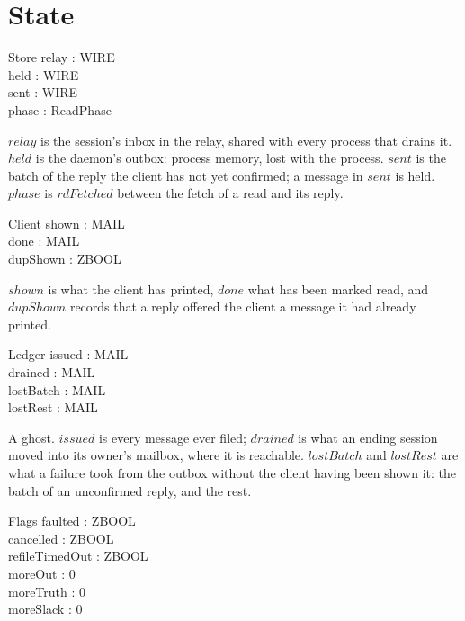 \documentclass[a4paper,10pt,fleqn]{article}
\begin{document}
\section{State}

\begin{schema}{Store}
  relay : \power WIRE \\
  held : \power WIRE \\
  sent : \power WIRE \\
  phase : ReadPhase
\end{schema}

$relay$ is the session's inbox in the relay, shared with every process that
drains it.  $held$ is the daemon's outbox: process memory, lost with the
process.  $sent$ is the batch of the reply the client has not yet confirmed;
a message in $sent$ is held.  $phase$ is $rdFetched$ between the fetch of a
read and its reply.

\begin{schema}{Client}
  shown : \power MAIL \\
  done : \power MAIL \\
  dupShown : ZBOOL
\end{schema}

$shown$ is what the client has printed, $done$ what has been marked read, and
$dupShown$ records that a reply offered the client a message it had already
printed.

\begin{schema}{Ledger}
  issued : \power MAIL \\
  drained : \power MAIL \\
  lostBatch : \power MAIL \\
  lostRest : \power MAIL
\end{schema}

A ghost.  $issued$ is every message ever filed; $drained$ is what an ending
session moved into its owner's mailbox, where it is reachable.  $lostBatch$
and $lostRest$ are what a failure took from the outbox without the client
having been shown it: the batch of an unconfirmed reply, and the rest.

\begin{schema}{Flags}
  faulted : ZBOOL \\
  cancelled : ZBOOL \\
  refileTimedOut : ZBOOL \\
  moreOut : 0  \\
  moreTruth : 0  \\
  moreSlack : 0 
\end{schema}
\end{document}
